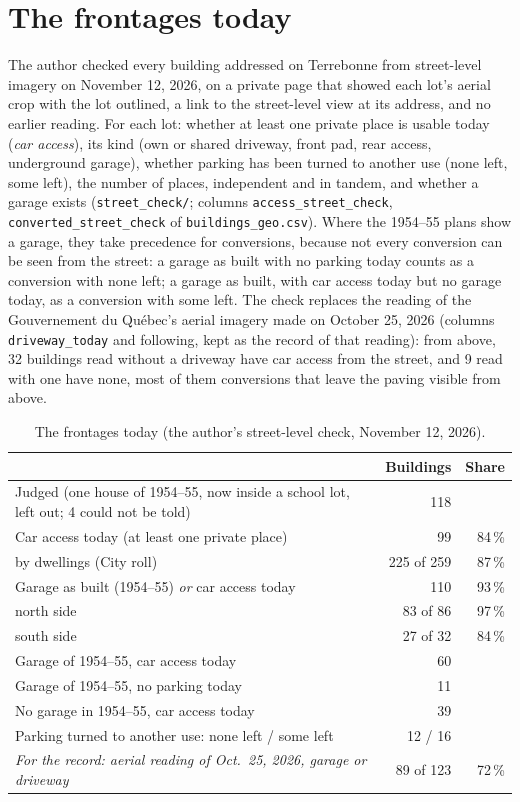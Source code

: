 \documentclass[11pt]{article}
\begin{document}
\section{The frontages today}
The author checked every building addressed on Terrebonne from street-level imagery on November 12, 2026, on a private page that showed each lot's aerial crop with the lot outlined, a link to the street-level view at its address, and no earlier reading. For each lot: whether at least one private place is usable today (\emph{car access}), its kind (own or shared driveway, front pad, rear access, underground garage), whether parking has been turned to another use (none left, some left), the number of places, independent and in tandem, and whether a garage exists (\texttt{street\_check/}; columns \texttt{access\_street\_check}, \texttt{converted\_street\_check} of \texttt{buildings\_geo.csv}). Where the 1954--55 plans show a garage, they take precedence for conversions, because not every conversion can be seen from the street: a garage as built with no parking today counts as a conversion with none left; a garage as built, with car access today but no garage today, as a conversion with some left. The check replaces the reading of the Gouvernement du Qu\'ebec's aerial imagery made on October 25, 2026 (columns \texttt{driveway\_today} and following, kept as the record of that reading): from above, 32 buildings read without a driveway have car access from the street, and 9 read with one have none, most of them conversions that leave the paving visible from above.

\begin{table}[h]\centering\small
\begin{tabular}{lrr}\toprule
 & Buildings & Share\\\midrule
Judged (one house of 1954--55, now inside a school lot, left out; 4 could not be told) & 118 & \\
Car access today (at least one private place) & 99 & 84\,\%\\
\quad by dwellings (City roll) & 225 of 259 & 87\,\%\\
Garage as built (1954--55) \emph{or} car access today & 110 & 93\,\%\\
\quad north side & 83 of 86 & 97\,\%\\
\quad south side & 27 of 32 & 84\,\%\\
Garage of 1954--55, car access today & 60 & \\
Garage of 1954--55, no parking today & 11 & \\
No garage in 1954--55, car access today & 39 & \\
Parking turned to another use: none left / some left & 12 / 16 & \\
\emph{For the record: aerial reading of Oct.~25, 2026, garage or driveway} & 89 of 123 & 72\,\%\\\bottomrule
\end{tabular}\caption{The frontages today (the author's street-level check, November 12, 2026).}\end{table}
\end{document}
